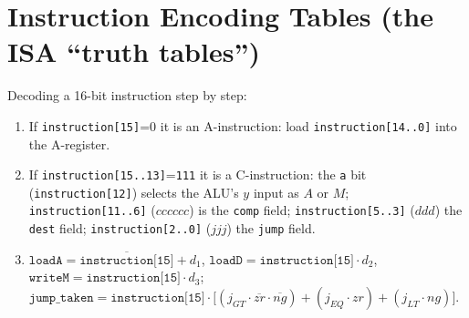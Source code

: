 \documentclass[11pt]{article}
\begin{document}
\section{Instruction Encoding Tables (the ISA ``truth tables'')}

Decoding a 16-bit instruction step by step:
\begin{enumerate}
  \item If \texttt{instruction[15]}=0 it is an A-instruction: load \texttt{instruction[14..0]} into the A-register.
  \item If \texttt{instruction[15..13]}=\texttt{111} it is a C-instruction: the \texttt{a} bit (\texttt{instruction[12]}) selects the ALU's $y$ input as $A$ or $M$; \texttt{instruction[11..6]} ($cccccc$) is the \texttt{comp} field; \texttt{instruction[5..3]} ($ddd$) the \texttt{dest} field; \texttt{instruction[2..0]} ($jjj$) the \texttt{jump} field.
  \item $\texttt{loadA} = \overline{\texttt{instruction[15]}} + d_1$, $\texttt{loadD} = \texttt{instruction[15]}\cdot d_2$, $\texttt{writeM} = \texttt{instruction[15]}\cdot d_3$; $\texttt{jump\_taken} = \texttt{instruction[15]}\cdot\big[(j_{GT}\cdot\overline{zr}\cdot\overline{ng})+(j_{EQ}\cdot zr)+(j_{LT}\cdot ng)\big]$.
\end{enumerate}
\end{document}
